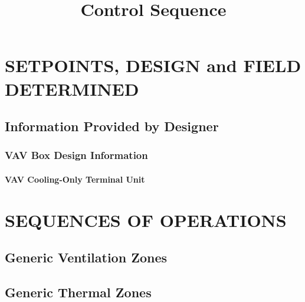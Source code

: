 \documentclass[letterpaper]{article}
\title{Control Sequence}
\author{}
\date{}
\begin{document}
\pagestyle{plain}

\maketitle

\renewcommand*\contentsname{\centering CONTENTS}

\newpage

\section{SETPOINTS, DESIGN and FIELD DETERMINED }
\subsection{Information Provided by Designer}

\addtocounter{subsubsection}{1}

\subsubsection{VAV Box Design Information}
\paragraph{VAV Cooling-Only Terminal Unit} \label{vav_cooling_only_terminal_unit}

\addtocounter{section}{1}  

\section{SEQUENCES OF OPERATIONS}

\addtocounter{subsection}{1}

\subsection{Generic Ventilation Zones} \label{generic_ventilation_zones}
\subsection{Generic Thermal Zones} \label{generic_thermal_zones}
\end{document}

